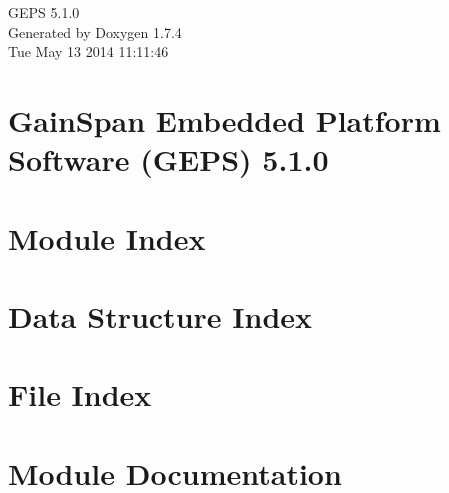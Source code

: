 \documentclass[a4paper]{book}
\begin{document}
\hypersetup{pageanchor=false}
\begin{titlepage}
\vspace*{7cm}
\begin{center}
{\Large GEPS 5.1.0 }\\
\vspace*{1cm}
{\large Generated by Doxygen 1.7.4}\\
\vspace*{0.5cm}
{\small Tue May 13 2014 11:11:46}\\
\end{center}
\end{titlepage}
\clearemptydoublepage
{}
\tableofcontents
\clearemptydoublepage
{}
\hypersetup{pageanchor=true}
\chapter{GainSpan Embedded Platform Software (GEPS) 5.1.0}
\label{index}\hypertarget{index}{}
\chapter{Module Index}

\chapter{Data Structure Index}

\chapter{File Index}

\chapter{Module Documentation}



































































\end{document}
